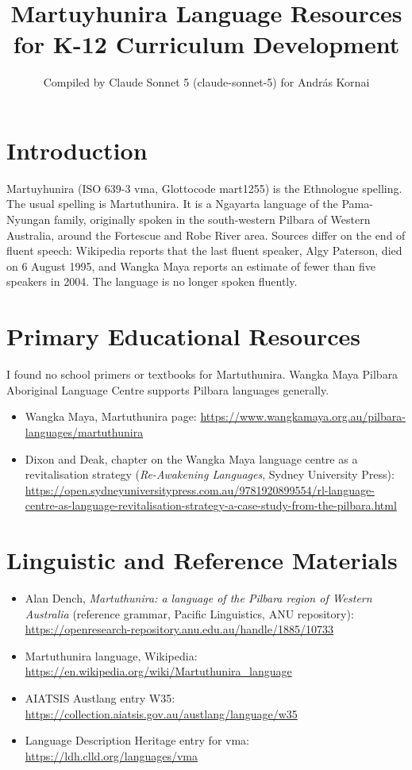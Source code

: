 \documentclass[12pt]{article}
\title{Martuyhunira Language Resources for K-12 Curriculum Development}
\author{Compiled by Claude Sonnet 5 (claude-sonnet-5) for Andr\'as Kornai}
\date{}
\begin{document}
\maketitle

\section{Introduction}
Martuyhunira (ISO 639-3 vma, Glottocode mart1255) is the Ethnologue spelling. The usual spelling is Martuthunira. It is a Ngayarta language of the Pama-Nyungan family, originally spoken in the south-western Pilbara of Western Australia, around the Fortescue and Robe River area. Sources differ on the end of fluent speech: Wikipedia reports that the last fluent speaker, Algy Paterson, died on 6 August 1995, and Wangka Maya reports an estimate of fewer than five speakers in 2004. The language is no longer spoken fluently.

\section{Primary Educational Resources}
I found no school primers or textbooks for Martuthunira. Wangka Maya Pilbara Aboriginal Language Centre supports Pilbara languages generally.
\begin{itemize}
\item Wangka Maya, Martuthunira page: \url{https://www.wangkamaya.org.au/pilbara-languages/martuthunira}
\item Dixon and Deak, chapter on the Wangka Maya language centre as a revitalisation strategy (\textit{Re-Awakening Languages}, Sydney University Press): \url{https://open.sydneyuniversitypress.com.au/9781920899554/rl-language-centre-as-language-revitalisation-strategy-a-case-study-from-the-pilbara.html}
\end{itemize}

\section{Linguistic and Reference Materials}
\begin{itemize}
\item Alan Dench, \textit{Martuthunira: a language of the Pilbara region of Western Australia} (reference grammar, Pacific Linguistics, ANU repository): \url{https://openresearch-repository.anu.edu.au/handle/1885/10733}
\item Martuthunira language, Wikipedia: \url{https://en.wikipedia.org/wiki/Martuthunira_language}
\item AIATSIS Austlang entry W35: \url{https://collection.aiatsis.gov.au/austlang/language/w35}
\item Language Description Heritage entry for vma: \url{https://ldh.clld.org/languages/vma}
\end{itemize}
\end{document}
